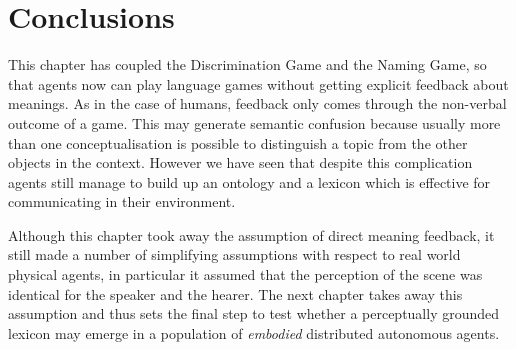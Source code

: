\section{Conclusions}

This chapter has coupled the Discrimination Game and 
the Naming Game, so that agents now can play language
games without getting explicit feedback about meanings. 
As in the case of humans, feedback only comes through 
the non-verbal outcome of a game. 
This may generate semantic confusion
because usually more than one conceptualisation is 
possible to distinguish a topic from the other objects
in the context. However we have seen that despite
this complication agents still manage to build up 
an ontology and a lexicon which is effective for 
communicating in their environment. 

Although this chapter took away the assumption of 
direct meaning feedback, it still made a number of 
simplifying assumptions with respect to real world
physical agents, in particular it assumed that 
the perception of the scene was identical for
the speaker and the hearer. The next chapter takes away 
this assumption and thus sets the final step to test 
whether a perceptually grounded lexicon may 
emerge in a population of {\itshape embodied} distributed 
autonomous agents. 

